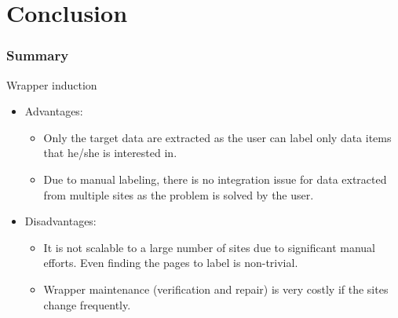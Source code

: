 \documentclass[svgnames]{beamer}
\begin{document}




\section{Conclusion}

\begin{frame} \frametitle{Summary}

  Wrapper induction
  \begin{itemize}
  \item Advantages:
    \begin{itemize}
    \item Only the target data are extracted as the user can label only data
      items that he/she is interested in.
    \item Due to manual labeling, there is no integration issue for data
      extracted from multiple sites as the problem is solved by the user.
    \end{itemize}
  \item Disadvantages:
    \begin{itemize}
    \item It is not scalable to a large number of sites due to significant
      manual efforts. Even finding the pages to label is non-trivial.
    \item Wrapper maintenance (verification and repair) is very costly if the
      sites change frequently.
    \end{itemize}
  \end{itemize}

\end{frame}
\end{document}
